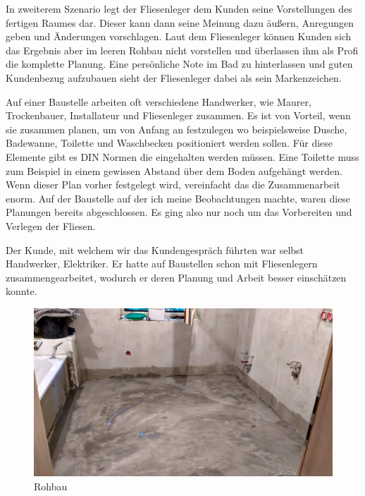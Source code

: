 In zweiterem Szenario legt der Fliesenleger dem Kunden seine Vorstellungen des fertigen Raumes dar. Dieser kann dann seine Meinung dazu äußern, Anregungen geben und Änderungen vorschlagen. Laut dem Fliesenleger können Kunden sich das Ergebnis aber im leeren Rohbau nicht vorstellen und überlassen ihm als Profi die komplette Planung. Eine persönliche Note im Bad zu hinterlassen und guten Kundenbezug aufzubauen sieht der Fliesenleger dabei als sein Markenzeichen.

Auf einer Baustelle arbeiten oft verschiedene Handwerker, wie Maurer, Trockenbauer, Installateur und Fliesenleger zusammen. Es ist von Vorteil, wenn sie zusammen planen, um von Anfang an festzulegen wo beispielsweise Dusche, Badewanne, Toilette und Waschbecken positioniert werden sollen. Für diese Elemente gibt es DIN Normen die eingehalten werden müssen. Eine Toilette muss zum Beispiel in einem gewissen Abstand über dem Boden aufgehängt werden. Wenn dieser Plan vorher festgelegt wird, vereinfacht das die Zusammenarbeit enorm. Auf der Baustelle auf der ich meine Beobachtungen machte, waren diese Planungen bereits abgeschlossen. Es ging also nur noch um das Vorbereiten und Verlegen der Fliesen.

Der Kunde, mit welchem wir das Kundengespräch führten war selbst Handwerker, Elektriker. Er hatte auf Baustellen schon mit Fliesenlegern zusammengearbeitet, wodurch er deren Planung und Arbeit besser einschätzen konnte. 

\begin{figure}[h]
	\begin{center}
		\noindent\includegraphics[scale=0.1]{Resources/Praktikum/IMG_20180801_090215_HDR.jpg}
		\caption{Rohbau}	
	\end{center}
\end{figure}

